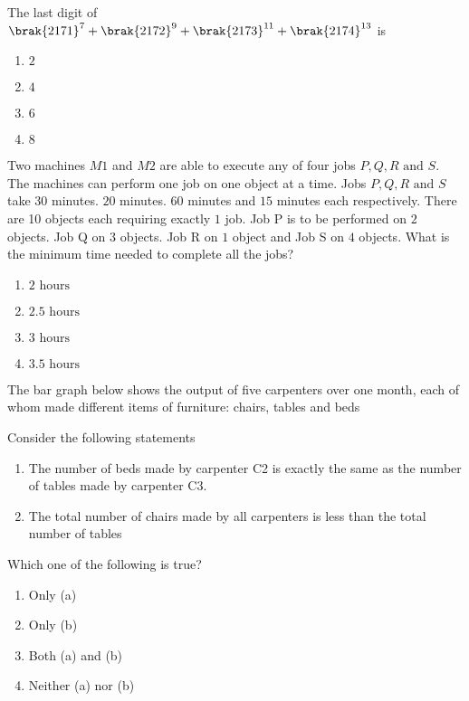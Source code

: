     \item The last digit of $\brak{2171}^7 + \brak{2172}^9 + \brak{2173}^{11} + \brak{2174}^{13}$ is
     \begin{multicols}{4}
        \begin{enumerate}
            \item $2$
            \item $4$
            \item $6$
            \item $8$
        \end{enumerate}
    \end{multicols}
    
    \item Two machines $M1$ and $M2$ are able to execute any of four jobs $P, Q, R \text{ and } S$. The machines can perform one job on one object at a time. Jobs $P, Q, R \text{ and } S$ take $30$ minutes. $20$ minutes. $60$ minutes and $15$ minutes each respectively. There are 10 objects each requiring exactly $1$ job. Job P is to be performed on $2$ objects. Job Q on $3$ objects. Job R on $1$ object and Job S on $4$ objects. What is the minimum time needed to complete all the jobs?
    \begin{multicols}{4}
        \begin{enumerate}
            \item $2 \text{ hours}$
            \item $2.5 \text{ hours}$
            \item $3 \text{ hours}$
            \item $3.5 \text{ hours}$
        \end{enumerate}
    \end{multicols}

    \item The bar graph below shows the output of five carpenters over one month, each of whom made different items of furniture: chairs, tables and beds
    
    
    Consider the following statements
    \begin{enumerate}
        \item The number of beds made by carpenter C2 is exactly the same as the number of tables made by carpenter C3.
        \item The total number of chairs made by all carpenters is less than the total number of tables
    \end{enumerate}
    Which one of the following is true?
    \begin{multicols}{4}
        \begin{enumerate}
            \item Only (a)
            \item Only (b)
            \item Both (a) and (b)
            \item Neither (a) nor (b)
        \end{enumerate}
    \end{multicols}
 
